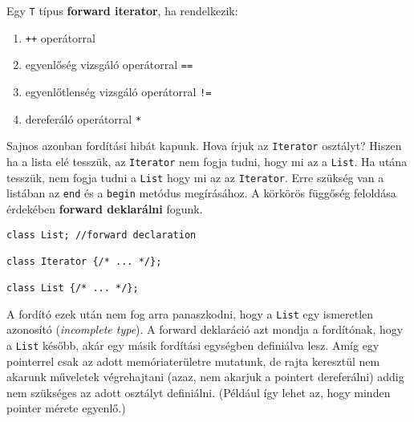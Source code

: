 \documentclass[a4paper,11.5pt,table]{article}
\begin{document}
	Egy \texttt{T} típus \textbf{forward iterator}, ha rendelkezik:
	\begin{enumerate}
		\item \texttt{++} operátorral
		\item egyenlőség vizsgáló operátorral \texttt{==}
		\item egyenlőtlenség vizsgáló operátorral \texttt{!=}
		\item dereferáló operátorral \texttt{*}
	\end{enumerate}
	Sajnos azonban fordítási hibát kapunk. Hova írjuk az \texttt{Iterator} osztályt? Hiszen ha a lista elé tesszük, az \texttt{Iterator} nem fogja tudni, hogy mi az a \texttt{List}. Ha utána tesszük, nem fogja tudni a \texttt{List} hogy mi az az \texttt{Iterator}. Erre szükség van a listában az \texttt{end} és a \texttt{begin} metódus megírásához. A körkörös függőség feloldása érdekében \textbf{forward deklarálni} fogunk. 
	\begin{lstlisting}
class List; //forward declaration

class Iterator {/* ... */};

class List {/* ... */};
	\end{lstlisting}
	A fordító ezek után nem fog arra panaszkodni, hogy a \texttt{List} egy ismeretlen azonosító (\textit{incomplete type}). A forward deklaráció azt mondja a fordítónak, hogy a \texttt{List} később, akár egy másik fordítási egységben definiálva lesz. Amíg egy pointerrel csak az adott memóriaterületre mutatunk, de rajta keresztül nem akarunk műveletek végrehajtani (azaz, nem akarjuk a pointert dereferálni) addig nem szükséges az adott osztályt definiálni. (Például így lehet az, hogy minden pointer mérete egyenlő.)
	
\end{document}

